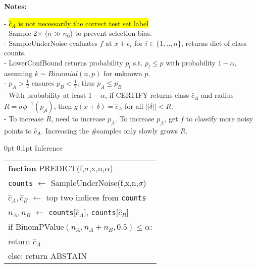 \documentclass[11pt,landscape,a4paper,fleqn]{article}
\makeatletter
\renewcommand{\subsection}{\@startsection{subsection}{1}{0mm}%
                                {0pt}%
                                {0.1pt}%
                            	{\color{myorange2}\sffamily\small}}
\newcommand{\mhl}[1]{\setlength{\fboxsep}{0pt}\colorbox{yellow}{#1}}
\makeatother
\begin{document}
\begin{multicols*}{4}
\textbf{Notes:}

- \mhl{$\hat{c}_A$ is not necessarily the correct test set label}\\
- Sample 2$\times$ ($n \gg n_0$) to prevent selection bias.\\
- SampleUnderNoise evaluates $f$ at $x + \epsilon_i$ for $i \in \{1,..,n\}$, returns dict of class counts.\\
- LowerConfBound returns probability $p_l$ s.t. $p_l \leq p$ with probability $1 - \alpha$, assuming $k \sim Binomial(n,p)$ for unknown $p$.\\
- $\underline{p_A} > \frac{1}{2}$ ensures $\overline{p_B} < \frac{1}{2}$, thus $\underline{p_A} \leq \overline{p_B}$\\
- With probability at least $1 - \alpha$, if CERTIFY returns class $\hat{c}_A$ and radius $R = \sigma \phi^{-1}(\underline{p_A})$, then $g(x+\delta) = \hat{c}_A$ for all $||\delta|| < R$.\\
- To increase $R$, need to increase $\underline{p_A}$. To increase $\underline{p_A}$, get $f$ to classify more noisy points to $\hat{c}_A$. Increasing the \#samples only slowly grows $R$.

\vspace*{1mm}
\subsection{Inference}

\begin{tabular}{l}
\hline 
\textbf{fuction} PREDICT(f,$\sigma$,x,n,$\alpha$) \hfil \\
\-\hspace*{3mm} \texttt{counts} $\leftarrow$ SampleUnderNoise(f,x,n,$\sigma$) \hfil \\
\-\hspace*{3mm} $\hat{c}_A, \hat{c}_B$ $\leftarrow$ top two indices from \texttt{counts} \hfill \\
\-\hspace*{3mm} $n_A, n_B$ $\leftarrow$ \texttt{counts}[$\hat{c}_A$], \texttt{counts}[$\hat{c}_B$] \hfil \\
\-\hspace*{3mm} if BinomPValue$(n_A,n_A + n_B,0.5) \leq \alpha$: \hfill \\
\-\hspace*{6mm} return $\hat{c}_A$ \hfill \\
\-\hspace*{3mm} else: return ABSTAIN \hfill \\ 
\hline 
\end{tabular} 


\end{multicols*}
\end{document}
